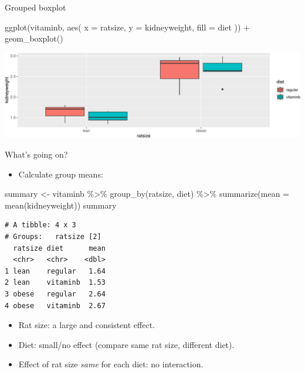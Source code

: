 \documentclass[
  ignorenonframetext,
]{beamer}
\newenvironment{Shaded}{\begin{snugshade}}{\end{snugshade}}
\newcommand{\AttributeTok}[1]{\textcolor[rgb]{0.40,0.45,0.13}{#1}}
\newcommand{\FunctionTok}[1]{\textcolor[rgb]{0.28,0.35,0.67}{#1}}
\newcommand{\NormalTok}[1]{\textcolor[rgb]{0.00,0.23,0.31}{#1}}
\newcommand{\OtherTok}[1]{\textcolor[rgb]{0.00,0.23,0.31}{#1}}
\newcommand{\SpecialCharTok}[1]{\textcolor[rgb]{0.37,0.37,0.37}{#1}}
\providecommand{\tightlist}{%
  \setlength{\itemsep}{0pt}\setlength{\parskip}{0pt}}\usepackage{longtable,booktabs,array}
\begin{document}
\begin{frame}[fragile]{Grouped boxplot}
\protect\hypertarget{grouped-boxplot}{}
\begin{Shaded}
\begin{Highlighting}[]
\FunctionTok{ggplot}\NormalTok{(vitaminb, }\FunctionTok{aes}\NormalTok{(}
  \AttributeTok{x =}\NormalTok{ ratsize, }\AttributeTok{y =}\NormalTok{ kidneyweight,}
  \AttributeTok{fill =}\NormalTok{ diet}
\NormalTok{)) }\SpecialCharTok{+} \FunctionTok{geom\_boxplot}\NormalTok{()}
\end{Highlighting}
\end{Shaded}

\includegraphics{anova_files/figure-beamer/bAnova-10-1.pdf}
\end{frame}

\begin{frame}[fragile]{What's going on?}
\protect\hypertarget{whats-going-on}{}
\begin{itemize}
\tightlist
\item
  Calculate group means:
\end{itemize}

\footnotesize

\begin{Shaded}
\begin{Highlighting}[]
\NormalTok{summary }\OtherTok{\textless{}{-}}\NormalTok{ vitaminb }\SpecialCharTok{\%\textgreater{}\%}
  \FunctionTok{group\_by}\NormalTok{(ratsize, diet) }\SpecialCharTok{\%\textgreater{}\%}
  \FunctionTok{summarize}\NormalTok{(}\AttributeTok{mean =} \FunctionTok{mean}\NormalTok{(kidneyweight))}
\NormalTok{summary}
\end{Highlighting}
\end{Shaded}

\begin{verbatim}
# A tibble: 4 x 3
# Groups:   ratsize [2]
  ratsize diet      mean
  <chr>   <chr>    <dbl>
1 lean    regular   1.64
2 lean    vitaminb  1.53
3 obese   regular   2.64
4 obese   vitaminb  2.67
\end{verbatim}

\normalsize

\begin{itemize}
\item
  Rat size: a large and consistent effect.
\item
  Diet: small/no effect (compare same rat size, different diet).
\item
  Effect of rat size \emph{same} for each diet: no interaction.
\end{itemize}
\end{frame}
\end{document}
